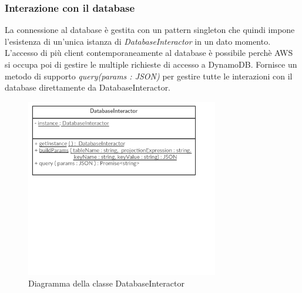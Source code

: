\subsubsection{Interazione con il database}
La connessione al database è gestita con un pattern singleton che quindi impone l'esistenza di un'unica istanza di \textit{DatabaseInteractor} in un dato momento. L'accesso di più client contemporaneamente al database è possibile perchè AWS si occupa poi di gestire le multiple richieste di accesso a DynamoDB.
Fornisce un metodo di supporto \textit{query(params : JSON)} per gestire tutte le interazioni con il database direttamente da DatabaseInteractor.


\begin{figure}[H]
	\begin{center}
		\includegraphics[width=0.75\textwidth, keepaspectratio]{../includes/pics/Singleton-Pattern.png}
		\caption{Diagramma della classe DatabaseInteractor}
	\end{center}
\end{figure}
